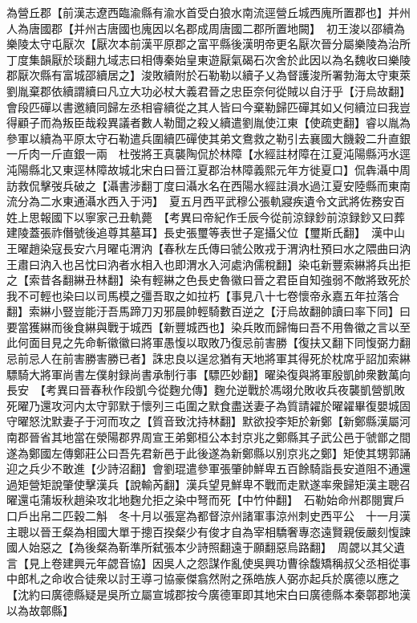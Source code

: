 為營丘郡【前漢志遼西臨渝縣有渝水首受白狼水南流逕營丘城西廆所置郡也】并州人為唐國郡【并州古唐國也廆因以名郡成周唐國二郡所置地闕】　初王浚以邵續為樂陵太守屯厭次【厭次本前漢平原郡之富平縣後漢明帝更名厭次晉分屬樂陵為治所丁度集韻厭於琰翻九域志曰相傳秦始皇東遊厭氣碣石次舍於此因以為名魏收曰樂陵郡厭次縣有富城邵續居之】浚敗續附於石勒勒以續子乂為督護浚所署勃海太守東萊劉胤棄郡依續謂續曰凡立大功必杖大義君晉之忠臣奈何從賊以自汙乎【汙烏故翻】會段匹磾以書邀續同歸左丞相睿續從之其人皆曰今棄勒歸匹磾其如乂何續泣曰我豈得顧子而為叛臣哉殺異議者數人勒聞之殺乂續遣劉胤使江東【使疏吏翻】睿以胤為參軍以續為平原太守石勒遣兵圍續匹磾使其弟文鴦救之勒引去襄國大饑穀二升直銀一斤肉一斤直銀一兩　杜弢將王真襲陶侃於林障【水經註材障在江夏沌陽縣沔水逕沌陽縣北又東逕林障故城北宋白曰晉江夏郡治林障義熙元年方徙夏口】侃犇灄中周訪救侃擊弢兵破之【灄書涉翻丁度曰灄水名在西陽水經註溳水過江夏安陸縣而東南流分為二水東通灄水西入于沔】　夏五月西平武穆公張軌寢疾遺令文武將佐務安百姓上思報國下以寧家己丑軌薨　【考異曰帝紀作壬辰今從前涼録鈔前涼録鈔又曰葬建陵蓋張祚僭號後追尊其墓耳】長史張璽等表世子寔攝父位【璽斯氏翻】　漢中山王曜趙染寇長安六月曜屯渭汭【春秋左氏傳曰虢公敗戎于渭汭杜預曰水之隈曲曰汭王肅曰汭入也呂忱曰汭者水相入也即渭水入河處汭儒稅翻】染屯新豐索綝將兵出拒之【索昔各翻綝丑林翻】染有輕綝之色長史魯徽曰晉之君臣自知強弱不敵將致死於我不可輕也染曰以司馬模之彊吾取之如拉朽【事見八十七卷懷帝永嘉五年拉落合翻】索綝小豎豈能汙吾馬蹄刀刃邪晨帥輕騎數百逆之【汙烏故翻帥讀曰率下同】曰要當獲綝而後食綝與戰于城西【新豐城西也】染兵敗而歸悔曰吾不用魯徽之言以至此何面目見之先命斬徽徽曰將軍愚愎以取敗乃復忌前害勝【復扶又翻下同愎弼力翻忌前忌人在前害勝害勝已者】誅忠良以逞忿猶有天地將軍其得死於枕席乎詔加索綝驃騎大將軍尚書左僕射録尚書承制行事【驃匹妙翻】曜染復與將軍殷凱帥衆數萬向長安　【考異曰晉春秋作段凱今從麴允傳】麴允逆戰於馮翊允敗收兵夜襲凱營凱敗死曜乃還攻河内太守郭默于懷列三屯圍之默食盡送妻子為質請糴於曜糴畢復嬰城固守曜怒沈默妻子于河而攻之【質音致沈持林翻】默欲投李矩於新鄭【新鄭縣漢屬河南郡晉省其地當在滎陽郡界周宣王弟鄭桓公本封京兆之鄭縣其子武公邑于虢鄫之間遂為鄭國左傳鄭莊公曰吾先君新邑于此後遂為新鄭縣以别京兆之鄭】矩使其甥郭誦迎之兵少不敢進【少詩沼翻】會劉琨遣參軍張肇帥鮮卑五百餘騎詣長安道阻不通還過矩營矩說肇使擊漢兵【說輸芮翻】漢兵望見鮮卑不戰而走默遂率衆歸矩漢主聰召曜還屯蒲坂秋趙染攻北地麴允拒之染中弩而死【中竹仲翻】　石勒始命州郡閱實戶口戶出帛二匹穀二斛　冬十月以張寔為都督涼州諸軍事涼州刺史西平公　十一月漢主聰以晉王粲為相國大單于摠百揆粲少有俊才自為宰相驕奢專恣遠賢親佞嚴刻愎諫國人始惡之【為後粲為靳準所弑張本少詩照翻遠于願翻惡烏路翻】　周勰以其父遺言【見上卷建興元年勰音協】因吳人之怨謀作亂使吳興功曹徐馥矯稱叔父丞相從事中郎札之命收合徒衆以討王導刁協豪傑翕然附之孫皓族人弼亦起兵於廣德以應之【沈約曰廣德縣疑是吳所立屬宣城郡按今廣德軍即其地宋白曰廣德縣本秦鄣郡地漢以為故鄣縣】


